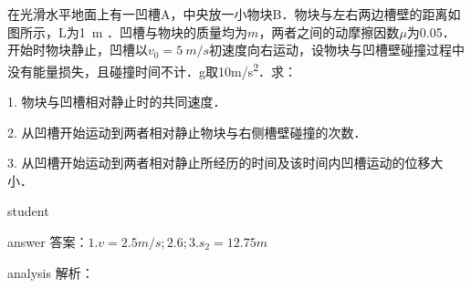 \begin{example}
	在光滑水平地面上有一凹槽A，中央放一小物块B．物块与左右两边槽壁的距离如图所示，L为\SI{1}{m} ．凹槽与物块的质量均为$ m $，两者之间的动摩擦因数$ \mu $为0.05．开始时物块静止，凹槽以$ v_0=\SI{5}{m/s} $初速度向右运动，设物块与凹槽壁碰撞过程中没有能量损失，且碰撞时间不计．g取10\si{m/s^2}．求：
	
	1. 物块与凹槽相对静止时的共同速度．
	
	
	2. 从凹槽开始运动到两者相对静止物块与右侧槽壁碰撞的次数．
	
	3. 从凹槽开始运动到两者相对静止所经历的时间及该时间内凹槽运动的位移大小．
	
	
	\begin{taggedblock}{student}
		\vspace*{2cm}
	\end{taggedblock}
	
	
	\begin{taggedblock}{answer}
		答案：$ 1. v=2.5\si{m/s}; 2. 6; 3. s_2 = 12.75\si{m} $
	\end{taggedblock}
	
	
	\begin{taggedblock}{analysis}
		解析：
	\end{taggedblock}
\end{example}